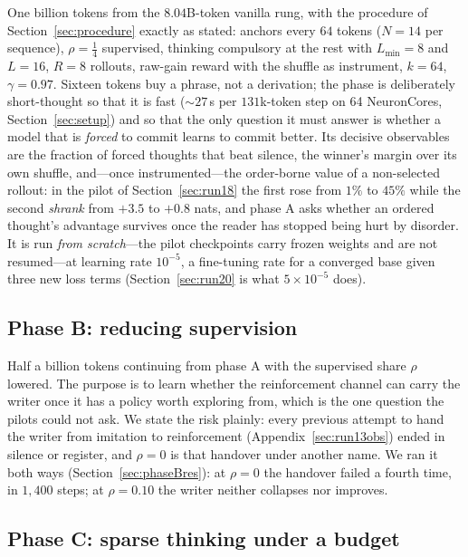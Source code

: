 \documentclass{article} %
\begin{document}
One billion tokens from the $8.04$B-token vanilla rung, with the procedure of Section~\ref{sec:procedure} exactly as stated: anchors every $64$ tokens ($N{=}14$ per sequence), $\rho = \tfrac14$ supervised, thinking compulsory at the rest with $L_{\min}{=}8$ and $L{=}16$, $R{=}8$ rollouts, raw-gain reward with the shuffle as instrument, $k{=}64$, $\gamma{=}0.97$. Sixteen tokens buy a phrase, not a derivation; the phase is deliberately short-thought so that it is fast (${\sim}27$\,s per $131$k-token step on 64 NeuronCores, Section~\ref{sec:setup}) and so that the only question it must answer is whether a model that is \emph{forced} to commit learns to commit better. Its decisive observables are the fraction of forced thoughts that beat silence, the winner's margin over its own shuffle, and---once instrumented---the order-borne value of a non-selected rollout: in the pilot of Section~\ref{sec:run18} the first rose from $1\%$ to $45\%$ while the second \emph{shrank} from $+3.5$ to $+0.8$ nats, and phase A asks whether an ordered thought's advantage survives once the reader has stopped being hurt by disorder. It is run \emph{from scratch}---the pilot checkpoints carry frozen weights and are not resumed---at learning rate $10^{-5}$, a fine-tuning rate for a converged base given three new loss terms (Section~\ref{sec:run20} is what $5\times10^{-5}$ does).

\subsection{Phase B: reducing supervision}
\label{sec:phaseB}

Half a billion tokens continuing from phase A with the supervised share $\rho$ lowered. The purpose is to learn whether the reinforcement channel can carry the writer once it has a policy worth exploring from, which is the one question the pilots could not ask. We state the risk plainly: every previous attempt to hand the writer from imitation to reinforcement (Appendix~\ref{sec:run13obs}) ended in silence or register, and $\rho = 0$ is that handover under another name. We ran it both ways (Section~\ref{sec:phaseBres}): at $\rho = 0$ the handover failed a fourth time, in $1{,}400$ steps; at $\rho = 0.10$ the writer neither collapses nor improves.

\subsection{Phase C: sparse thinking under a budget}
\label{sec:budget}
\end{document}
